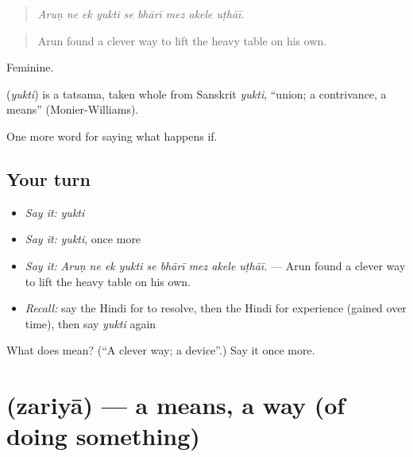 \begin{quote}
        
\end{quote}

\begin{quote}
\emph{Aruṇ ne ek yukti se bhārī mez akele uṭhāī.}
\end{quote}

\begin{quote}
Arun found a clever way to lift the heavy table on his own.
\end{quote}

Feminine.

\begin{cousinweb}
\textbf{} (\emph{yukti}) is a tatsama, taken whole from Sanskrit \emph{yukti}, \textquotedblleft{}union; a contrivance, a means\textquotedblright{} (Monier-Williams).
\end{cousinweb}

\begin{grammarlens}[title={What you've built}]
One more word for saying what happens if.
\end{grammarlens}

\subsection*{Your turn}
\begin{itemize}
\raggedright
  \item \emph{Say it:} \emph{yukti}
  \item \emph{Say it:} \emph{yukti}, once more
  \item \emph{Say it:} \emph{Aruṇ ne ek yukti se bhārī mez akele uṭhāī.} — Arun found a clever way to lift the heavy table on his own.
  \item \emph{Recall:} say the Hindi for to resolve, then the Hindi for experience (gained over time), then say \emph{yukti} again
\end{itemize}

\begin{tcolorbox}[breakable,colback=teal!4,colframe=teal!35!black,title={Before you move on}]
What does  mean? (\textquotedblleft{}A clever way; a device\textquotedblright{}.) Say it once more.
\end{tcolorbox}
\section[\texorpdfstring{\hi{ज़रिया} (zariyā)}{ज़रिया (zariyā)}]{ (zariyā) — a means, a way (of doing something)}

